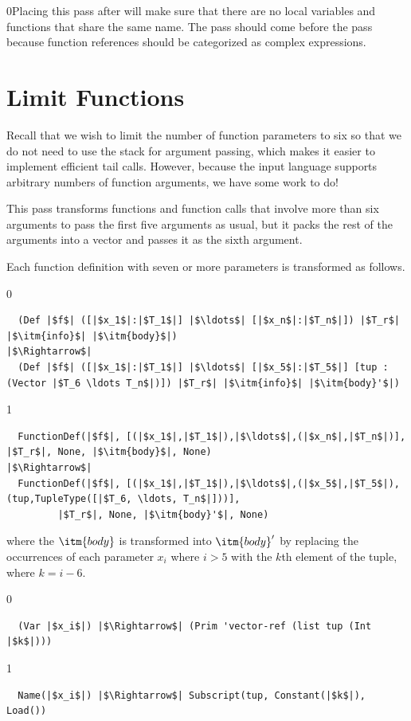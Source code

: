 \documentclass[7x10,nocrop]{TimesAPriori_MIT}%
\def\racketEd{0}
\def\pythonEd{1}
\def\edition{1}
\newcommand{\racket}[1]{{\if\edition\racketEd{#1}\fi}}
\begin{document}

\racket{Placing this pass after  will make sure that
  there are no local variables and functions that share the same
  name.}
%
The  pass should come before the
 pass because function references
should be categorized as complex expressions.

\section{Limit Functions}
\label{sec:limit-functions-r4}

Recall that we wish to limit the number of function parameters to six
so that we do not need to use the stack for argument passing, which
makes it easier to implement efficient tail calls.  However, because
the input language \LangFun{} supports arbitrary numbers of function
arguments, we have some work to do!

This pass transforms functions and function calls that involve more
than six arguments to pass the first five arguments as usual, but it
packs the rest of the arguments into a vector and passes it as the
sixth argument.

Each function definition with seven or more parameters is transformed as
follows.
{\if\edition\racketEd   
\begin{lstlisting}
  (Def |$f$| ([|$x_1$|:|$T_1$|] |$\ldots$| [|$x_n$|:|$T_n$|]) |$T_r$| |$\itm{info}$| |$\itm{body}$|) 
|$\Rightarrow$|
  (Def |$f$| ([|$x_1$|:|$T_1$|] |$\ldots$| [|$x_5$|:|$T_5$|] [tup : (Vector |$T_6 \ldots T_n$|)]) |$T_r$| |$\itm{info}$| |$\itm{body}'$|) 
\end{lstlisting}
\fi}
{\if\edition\pythonEd   
\begin{lstlisting}
  FunctionDef(|$f$|, [(|$x_1$|,|$T_1$|),|$\ldots$|,(|$x_n$|,|$T_n$|)], |$T_r$|, None, |$\itm{body}$|, None)
|$\Rightarrow$|
  FunctionDef(|$f$|, [(|$x_1$|,|$T_1$|),|$\ldots$|,(|$x_5$|,|$T_5$|),(tup,TupleType([|$T_6, \ldots, T_n$|]))],
         |$T_r$|, None, |$\itm{body}'$|, None)
\end{lstlisting}
\fi}
%
\noindent where the $\itm{body}$ is transformed into $\itm{body}'$ by
replacing the occurrences of each parameter $x_i$ where $i > 5$ with
the $k$th element of the tuple, where $k = i - 6$.
%
{\if\edition\racketEd
\begin{lstlisting}
  (Var |$x_i$|) |$\Rightarrow$| (Prim 'vector-ref (list tup (Int |$k$|)))
\end{lstlisting}
\fi}
{\if\edition\pythonEd   
\begin{lstlisting}
  Name(|$x_i$|) |$\Rightarrow$| Subscript(tup, Constant(|$k$|), Load())
\end{lstlisting}
\fi}
\end{document}

